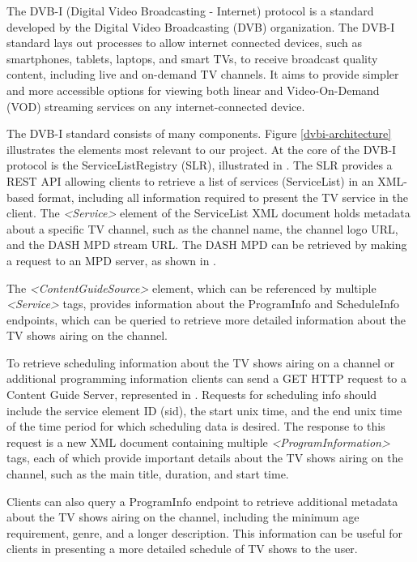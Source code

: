 \documentclass[conference]{IEEEtran}
\begin{document}
The DVB-I (Digital Video Broadcasting - Internet) \cite{DVBI-I} protocol is a standard developed by the Digital Video Broadcasting (DVB) \cite{DVB} organization. The DVB-I standard lays out processes to allow internet connected devices, such as smartphones, tablets, laptops, and smart TVs, to receive broadcast quality content, including live and on-demand TV channels. It aims to provide simpler and more accessible options for viewing both linear and Video-On-Demand (VOD) streaming services on any internet-connected device.

The DVB-I standard consists of many components. Figure \ref{dvbi-architecture} illustrates the elements most relevant to our project. At the core of the DVB-I protocol is the ServiceListRegistry (SLR), illustrated in . The SLR provides a REST API allowing clients to retrieve a list of services (ServiceList) in an XML-based format, including all information required to present the TV service in the client. The \textit{<Service>} element of the ServiceList XML document holds metadata about a specific TV channel, such as the channel name, the channel logo URL, and the DASH MPD stream URL. The DASH MPD can be retrieved by making a request to an MPD server, as shown in  .

The \textit{<ContentGuideSource>} element, which can be referenced by multiple \textit{<Service>} tags, provides information about the ProgramInfo and ScheduleInfo endpoints, which can be queried to retrieve more detailed information about the TV shows airing on the channel.

To retrieve scheduling information about the TV shows airing on a channel or additional programming information clients can send a GET HTTP request to a Content Guide Server, represented in . Requests for scheduling info should include the service element ID (sid), the start unix time, and the end unix time of the time period for which scheduling data is desired. The response to this request is a new XML document containing multiple \textit{<ProgramInformation>} tags, each of which provide important details about the TV shows airing on the channel, such as the main title, duration, and start time.

Clients can also query a ProgramInfo endpoint to retrieve additional metadata about the TV shows airing on the channel, including the minimum age requirement, genre, and a longer description. This information can be useful for clients in presenting a more detailed schedule of TV shows to the user.
\end{document}
